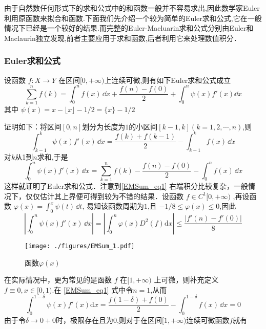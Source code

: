 
由于自然数任何形式下的求和公式中的和函数一般并不容易求出,因此数学家Euler利用原函数来拟合和函数.下面我们先介绍一个较为简单的Euler求和公式,它在一般情况下已经是一个较好的结果.而完整的Euler-Macluarin求和公式分别由Euler和Maclaurin独立发现,前者主要应用于求和函数,后者利用它来处理数值积分．

\subsubsection{Euler求和公式}

\begin{theorem}{}
设函数 $f:X\to Y$ 在区间$[0,+\infty)$上连续可微,则有如下Euler求和公式成立	
        \begin{equation}\label{EMSum_eq1} 
            \sum_{k=1}^{n}f(k)=\int_{0}^{n}f(x)\,\dd x
            +\frac{f(n)-f(0)}{2}+\int_{0}^{n}\psi(x)f'(x)\dd x
        \end{equation}
    其中 $\psi(x)=x-\lfloor x \rfloor-1/2=\{x\}-1/2$
\end{theorem}
证明如下：将区间$[0,n]$划分为长度为$1$的小区间$[k-1,k](k=1,2,\cdots,n)$,则
​\[
    \int_{k-1}^{k}\psi(x)f'(x)\,\dd x
    =\frac{f(k)+f(k-1)}{2}-\int_{k-1}^{k}f(x)\,\dd x
\]
​对$k$从1到$n$求和,于是
​\[
    \int_{0}^{n}\psi(x)f'(x)\,\dd x
    =\sum_{k=1}^{n}f(k)-\frac{f(n)-f(0)}{2}-\int_{0}^{n}f(x)\,\dd x
\]
这样就证明了Euler求和公式．注意到\autoref{EMSum_eq1} 右端积分比较复杂，一般情况下，仅仅估计其上界便可得到较为不错的结果．设函数 $f\in{C^1[0,+\infty)}$ ,再设函数
$\varphi(x)=\displaystyle{\int_{0}^{x}\psi(t)\,\dd t}$,
易知该函数周期为$1$,且
 $-1/8\leqslant\varphi(x)\leqslant 0$,因此
\[
    \left|\int_{0}^{n}\psi(x)f'(x)\,\dd x\right|
    =\left|\int_{0}^{n}\varphi(x)D^2(f)\mathrm{d}x\right|
    \leqslant\frac{|f'(n)-f'(0)|}{8}
\]
\begin{figure}[ht]
\centering
\texttt{[image: ./figures/EMSum\_1.pdf]}
\caption{函数$\varphi(x)$} \label{EMSum_fig1}
\end{figure}
在实际情况中，更为常见的是函数 $f$ 在$[1,+\infty)$ 上可微，则补充定义$ f\equiv 0,x\in[0,1)$.在 \autoref{EMSum_eq1} 式中令$n=1$,从而
\[
    \int_{0}^{1-\delta}\psi(x)f'(x)\mathrm{d}x
    =\frac{f(1-\delta)+f(0)}{2}-\int_{0}^{1-\delta}f(x)\,\dd x=0
\]
由于令$\delta\to0+0$时，极限存在且为$0$,则对于在区间$[1,+\infty)$连续可微函数$f$就有

